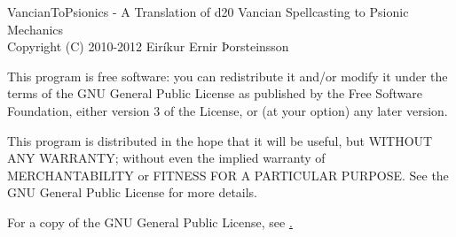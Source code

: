 VancianToPsionics - A Translation of d20 Vancian Spellcasting to Psionic Mechanics\\
Copyright (C) 2010-2012 Eiríkur Ernir Þorsteinsson

This program is free software: you can redistribute it and/or modify
it under the terms of the GNU General Public License as published by
the Free Software Foundation, either version 3 of the License, or
(at your option) any later version.

This program is distributed in the hope that it will be useful,
but WITHOUT ANY WARRANTY; without even the implied warranty of
MERCHANTABILITY or FITNESS FOR A PARTICULAR PURPOSE.  See the
GNU General Public License for more details.

For a copy of the GNU General Public License, see \href{http://www.gnu.org/licenses/}.